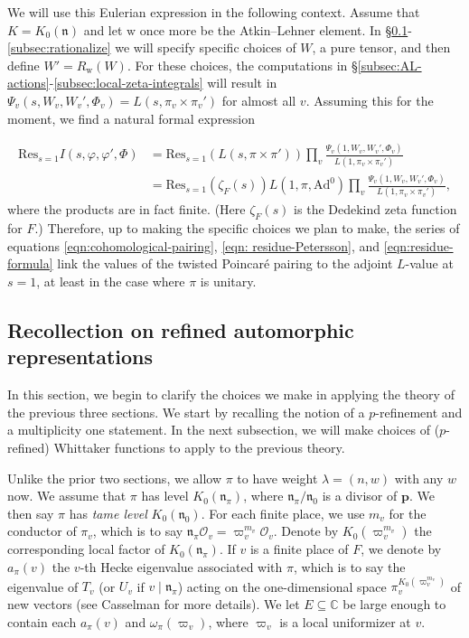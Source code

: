 \documentclass[10pt, twoside]{amsart}
\theoremstyle{plain}
\theoremstyle{definition}
\theoremstyle{remark}
\numberwithin{equation}{subsection}
\def\C{\mathbb C}
\def\p{\mathbf{p}}
\def\Ad{\mathrm{Ad}}
\def\Res{\mathrm{Res}}
\def\gn{\mathfrak n}
\def\scro{\mathscr O}
\def\scro{\mathscr O}
\begin{document}
We will use this Eulerian expression in the following context. Assume that $K = K_0(\gn)$ and let ${ \boldsymbol{\mathrm{w}}}$ once more be the Atkin--Lehner element. In \S \ref{subsec:refined-automorphic}-\ref{subsec:rationalize} we will specify specific choices of $W$, a pure tensor, and then define $W' = R_{{ \boldsymbol{\mathrm{w}}}}(W)$. For these choices, the computations in \S \ref{subsec:AL-actions}-\ref{subsec:local-zeta-integrals} will result in $\Psi_v(s,W_v,W_v',\Phi_v) = L(s,\pi_v\times \pi_v')$ for almost all $v$. Assuming this for the moment, we find a natural formal expression

\begin{align}\label{eqn:residue-formula}
\Res_{s=1} I(s,\varphi,\varphi',\Phi) &= \Res_{s=1} \left(L(s,\pi\times \pi')\right) \prod_{v} \frac{\Psi_v(1,W_v,W_v',\Phi_v)}{L(1,\pi_v\times \pi_v')}\\
&= \Res_{s=1}(\zeta_F(s)) L(1,\pi, \Ad^0) \prod_{v} \frac{\Psi_v(1,W_v,W_v',\Phi_v)}{L(1,\pi_v\times \pi_v')},\nonumber
\end{align}
where the products are in fact finite. (Here $\zeta_F(s)$ is the Dedekind zeta function for $F$.) Therefore, up to making the specific choices we plan to make, the series of equations \eqref{eqn:cohomological-pairing}, \eqref{eqn: residue-Petersson}, and \eqref{eqn:residue-formula} link the values of the twisted Poincar\'e pairing to the adjoint $L$-value at $s = 1$, at least in the case where $\pi$ is unitary.

\subsection{Recollection on refined automorphic representations}\label{subsec:refined-automorphic}
In this section, we begin to clarify the choices we make in applying the theory of the previous three sections. We start by recalling the notion of a $p$-refinement and a multiplicity one statement. In the next subsection, we will make choices of ($p$-refined) Whittaker functions to apply to the previous theory.

Unlike the prior two sections, we allow $\pi$ to have weight $\lambda = (n,w)$ with any $w$ now. We assume that $\pi$ has level $K_0(\gn_\pi)$, where $\gn_\pi/\gn_0$ is a divisor of $\p$. We then say $\pi$ has {\em tame level} $K_0(\gn_0)$. For each finite place, we use $m_v$ for the conductor of $\pi_v$, which is to say $\gn_{\pi}\scro_v = \varpi_v^{m_v}\scro_v$. Denote by $K_0(\varpi_v^{m_v})$ the corresponding local factor of $K_0(\gn_{\pi})$. If $v$ is a finite place of $F$, we denote by $a_\pi(v)$ the $v$-th Hecke eigenvalue associated with $\pi$, which is to say the eigenvalue of $T_v$ (or $U_v$ if $v \mid \gn_{\pi}$) acting on the one-dimensional space $\pi_v^{K_0(\varpi_v^{m_v})}$ of new vectors (see Casselman \cite{Cas} for more details). We let $E \subseteq \C$ be large enough to contain each  $a_\pi(v)$ and $\omega_{\pi}(\varpi_v)$, where $\varpi_v$ is a local uniformizer at $v$.
\end{document}
